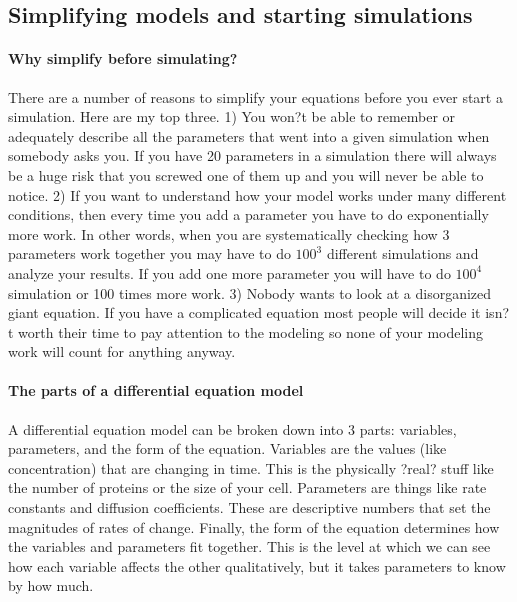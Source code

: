 \subsection{Simplifying models and starting simulations}
\paragraph{Why simplify before simulating?} There are a number of reasons to simplify your equations before you ever start a simulation.  Here are my top three.  
1) You won?t be able to remember or adequately describe all the parameters that went into a given simulation when somebody asks you.  If you have 20 parameters in a simulation there will always be a huge risk that you screwed one of them up and you will never be able to notice.  
2) If you want to understand how your model works under many different conditions, then every time you add a parameter you have to do exponentially more work.  In other words, when you are systematically checking how 3 parameters work together you may have to do $100^3$ different simulations and analyze your results.  If you add one more parameter you will have to do $100^4$ simulation or 100 times more work.  
3) Nobody wants to look at a disorganized giant equation.  If you have a complicated equation most people will decide it isn?t worth their time to pay attention to the modeling so none of your modeling work will count for anything anyway.

\paragraph{The parts of a differential equation model} A differential equation model can be broken down into 3 parts: variables, parameters, and the form of the equation.  Variables are the values (like concentration) that are changing in time.  This is the physically ?real? stuff like the number of proteins or the size of your cell.  Parameters are things like rate constants and diffusion coefficients.  These are descriptive numbers that set the magnitudes of rates of change.  Finally, the form of the equation determines how the variables and parameters fit together.  This is the level at which we can see how each variable affects the other qualitatively, but it takes parameters to know by how much.

